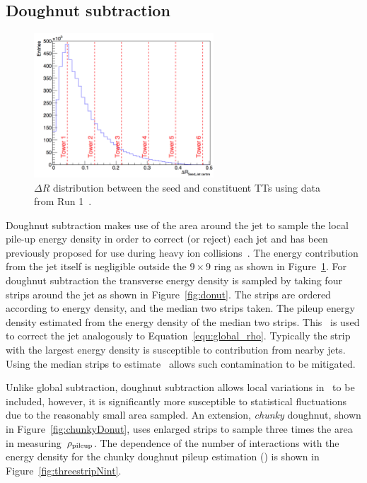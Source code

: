 \subsection{Doughnut subtraction}
\begin{figure}
\centering
    \includegraphics[width=0.6\textwidth]{./Figures/triggerUpgrade/deltaR2}
  \caption{$\Delta R$ distribution between the seed and constituent TTs using data from Run 1~\cite{mark-thesis}.}
  \label{fig:deltaR2}
\end{figure}  


Doughnut subtraction makes use of the area around the jet to sample the local pile-up
energy density in order to correct (or reject) each jet and has been previously proposed
for use during heavy ion collisions~\cite{doughnut}. The energy contribution from the jet
itself is negligible outside the $9\times9$ ring as shown in Figure~\ref{fig:deltaR2}. 
For doughnut subtraction the transverse energy density is sampled by taking four strips around 
the jet as shown in Figure~\ref{fig:donut}. The strips are ordered according to energy density,
and the median two strips taken. The pileup energy density estimated from the 
energy density of the median two strips. This \rhoD~is used to correct the
jet analogously to Equation~\ref{equ:global_rho}. Typically the strip with the largest
energy density is susceptible to contribution from nearby jets. Using the median 
strips to estimate \rhoP~allows such contamination to be mitigated.

Unlike global subtraction, doughnut subtraction allows local variations in \rhoP~to be 
included, however, it is significantly more susceptible to statistical fluctuations due to the 
reasonably small area sampled. An extension, \emph{chunky} doughnut, shown in Figure~\ref{fig:chunkyDonut},
uses enlarged strips to sample three times the area in measuring~$\rho_{\text{pileup}}$. The dependence of the number of interactions
with the energy density for the chunky doughnut pileup estimation (\rhoC) is shown in Figure~\ref{fig:threestripNint}.


